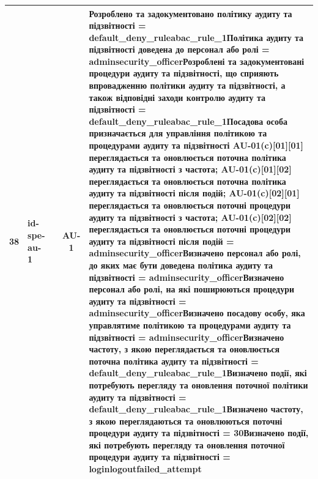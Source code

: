 \documentclass[10pt]{article}
\begin{document}
\begin{longtable}{|c|>{\raggedright\arraybackslash}p{2.5cm}|>{\raggedright\arraybackslash}p{4.5cm}|c|>{\raggedright\arraybackslash}p{4.5cm}|}
38 & id-spe-au-1 &  & AU-1 & Розроблено та задокументовано політику аудиту та підзвітності = \textbf{default\_\allowbreak{}deny\_\allowbreak{}ruleabac\_\allowbreak{}rule\_\allowbreak{}1}\newline Політика аудиту та підзвітності доведена до персонал або ролі = \textbf{adminsecurity\_\allowbreak{}officer}\newline Розроблені та задокументовані процедури аудиту та підзвітності, що сприяють впровадженню політики аудиту та підзвітності, а також відповідні заходи контролю аудиту та підзвітності = \textbf{default\_\allowbreak{}deny\_\allowbreak{}ruleabac\_\allowbreak{}rule\_\allowbreak{}1}\newline Посадова особа призначається для управління політикою та процедурами аудиту та підзвітності AU-01(c)[01][01] переглядається та оновлюється поточна політика аудиту та підзвітності з частота; AU-01(c)[01][02] переглядається та оновлюється поточна політика аудиту та підзвітності після подій; AU-01(c)[02][01] переглядається та оновлюється поточні процедури аудиту та підзвітності з частота; AU-01(c)[02][02] переглядається та оновлюється поточні процедури аудиту та підзвітності після подій = \textbf{adminsecurity\_\allowbreak{}officer}\newline Визначено персонал або ролі, до яких має бути доведена політика аудиту та підзвітності = \textbf{adminsecurity\_\allowbreak{}officer}\newline Визначено персонал або ролі, на які поширюються процедури аудиту та підзвітності = \textbf{adminsecurity\_\allowbreak{}officer}\newline Визначено посадову особу, яка управлятиме політикою та процедурами аудиту та підзвітності = \textbf{adminsecurity\_\allowbreak{}officer}\newline Визначено частоту, з якою переглядається та оновлюється поточна політика аудиту та підзвітності = \textbf{default\_\allowbreak{}deny\_\allowbreak{}ruleabac\_\allowbreak{}rule\_\allowbreak{}1}\newline Визначено події, які потребують перегляду та оновлення поточної політики аудиту та підзвітності = \textbf{default\_\allowbreak{}deny\_\allowbreak{}ruleabac\_\allowbreak{}rule\_\allowbreak{}1}\newline Визначено частоту, з якою переглядаються та оновлюються поточні процедури аудиту та підзвітності = \textbf{30}\newline Визначено події, які потребують перегляду та оновлення поточної процедури аудиту та підзвітності = \textbf{loginlogoutfailed\_\allowbreak{}attempt} \\ \hline

\end{longtable}
\end{document}
